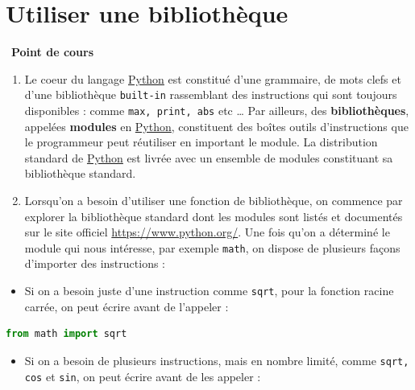 \documentclass[
  11pt,
]{article}
\newcommand{\passthrough}[1]{#1}
\providecommand{\tightlist}{%
  \setlength{\itemsep}{0pt}\setlength{\parskip}{0pt}}
\newcounter{def}
\newcounter{cours}
\newenvironment{cours}[1]
{\par \medskip   \addtocounter{cours}{1} \noindent  
\begin{bclogo}[arrondi =0.1,  ombre = true, barre=none, logo=\bcbook, marge=4]{~\textbf{Point de cours} \textbf{\thecours} {\itshape #1} }  \par}
{
\end{bclogo}
 \par \bigskip }
\newcounter{prog}
\begin{document}
\hypertarget{utiliser-une-bibliothuxe8que}{%
\section{Utiliser une bibliothèque}\label{utiliser-une-bibliothuxe8que}}

\begin{cours}{}

\begin{enumerate}
\def\labelenumi{\arabic{enumi}.}
\item
  Le coeur du langage
  \href{https://docs.python.org/3/tutorial/datastructures.html}{Python}
  est constitué d'une grammaire, de mots clefs et d'une bibliothèque
  \passthrough{\lstinline!built-in!} rassemblant des instructions qui
  sont toujours disponibles : comme
  \passthrough{\lstinline!max, print, abs!} etc \ldots{} Par ailleurs,
  des \textbf{bibliothèques}, appelées \textbf{modules} en
  \href{https://docs.python.org/3/tutorial/datastructures.html}{Python},
  constituent des boîtes outils d'instructions que le programmeur peut
  réutiliser en important le module. La distribution standard de
  \href{https://docs.python.org/3/tutorial/datastructures.html}{Python}
  est livrée avec un ensemble de modules constituant sa bibliothèque
  standard.
\item
  Lorsqu'on a besoin d'utiliser une fonction de bibliothèque, on
  commence par explorer la bibliothèque standard dont les modules sont
  listés et documentés sur le site officiel
  \url{https://www.python.org/}. Une fois qu'on a déterminé le module
  qui nous intéresse, par exemple \passthrough{\lstinline!math!}, on
  dispose de plusieurs façons d'importer des instructions :
\end{enumerate}

\begin{itemize}
\tightlist
\item
  Si on a besoin juste d'une instruction comme
  \passthrough{\lstinline!sqrt!}, pour la fonction racine carrée, on
  peut écrire avant de l'appeler :
\end{itemize}

\begin{lstlisting}[language=Python]
from math import sqrt
\end{lstlisting}

\begin{itemize}
\tightlist
\item
  Si on a besoin de plusieurs instructions, mais en nombre limité, comme
  \passthrough{\lstinline!sqrt, cos!} et \passthrough{\lstinline!sin!},
  on peut écrire avant de les appeler :
\end{itemize}


\end{cours}
\end{document}
